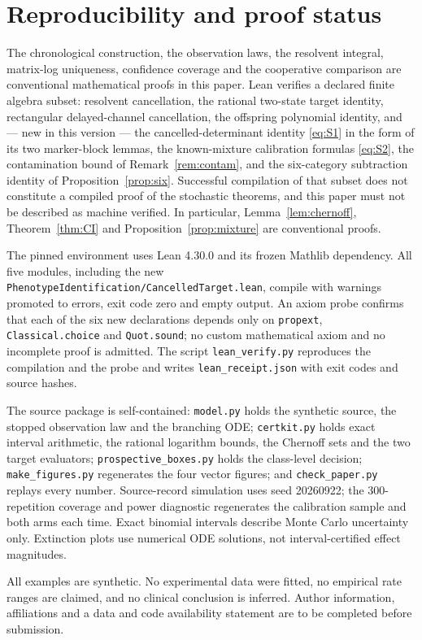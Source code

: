 \documentclass[11pt]{article}
\theoremstyle{definition}
\begin{document}
\section{Reproducibility and proof status}
The chronological construction, the observation laws, the resolvent integral,
matrix-log uniqueness, confidence coverage and the cooperative comparison are
conventional mathematical proofs in this paper. Lean verifies a declared finite
algebra subset: resolvent cancellation, the rational two-state target identity,
rectangular delayed-channel cancellation, the offspring polynomial identity, and
--- new in this version --- the cancelled-determinant identity \eqref{eq:S1} in
the form of its two marker-block lemmas, the known-mixture calibration formulas
\eqref{eq:S2}, the contamination bound of Remark~\ref{rem:contam}, and the
six-category subtraction identity of Proposition~\ref{prop:six}. Successful
compilation of that subset does not constitute a compiled proof of the
stochastic theorems, and this paper must not be described as machine verified.
In particular, Lemma~\ref{lem:chernoff}, Theorem~\ref{thm:CI} and
Proposition~\ref{prop:mixture} are conventional proofs.

The pinned environment uses Lean 4.30.0 and its frozen Mathlib dependency. All
five modules, including the new
\texttt{PhenotypeIdentification/CancelledTarget.lean}, compile with warnings
promoted to errors, exit code zero and empty output. An axiom probe confirms
that each of the six new declarations depends only on \texttt{propext},
\texttt{Classical.choice} and \texttt{Quot.sound}; no custom mathematical axiom
and no incomplete proof is admitted. The script \texttt{lean\_verify.py}
reproduces the compilation and the probe and writes
\texttt{lean\_receipt.json} with exit codes and source hashes.

The source package is self-contained: \texttt{model.py} holds the synthetic
source, the stopped observation law and the branching ODE; \texttt{certkit.py}
holds exact interval arithmetic, the rational logarithm bounds, the Chernoff
sets and the two target evaluators; \texttt{prospective\_boxes.py} holds the
class-level decision; \texttt{make\_figures.py} regenerates the four vector
figures; and \texttt{check\_paper.py} replays every number. Source-record
simulation uses seed 20260922; the 300-repetition coverage and power diagnostic
regenerates the calibration sample and both arms each time. Exact binomial
intervals describe Monte Carlo uncertainty only. Extinction plots use numerical
ODE solutions, not interval-certified effect magnitudes.

All examples are synthetic. No experimental data were fitted, no empirical rate
ranges are claimed, and no clinical conclusion is inferred. Author information,
affiliations and a data and code availability statement are to be completed
before submission.



\end{document}
